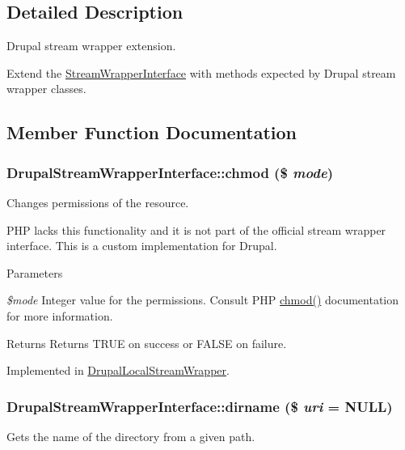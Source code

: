 \subsection{Detailed Description}
Drupal stream wrapper extension.

Extend the \hyperlink{interfaceStreamWrapperInterface}{StreamWrapperInterface} with methods expected by Drupal stream wrapper classes. 

\subsection{Member Function Documentation}
\hypertarget{interfaceDrupalStreamWrapperInterface_a1b1e5436bc2d310b1d340f389f7484b3}{
\subsubsection[{chmod}]{\setlength{\rightskip}{0pt plus 5cm}DrupalStreamWrapperInterface::chmod (\$ {\em mode})}}
\label{interfaceDrupalStreamWrapperInterface_a1b1e5436bc2d310b1d340f389f7484b3}
Changes permissions of the resource.

PHP lacks this functionality and it is not part of the official stream wrapper interface. This is a custom implementation for Drupal.


\begin{DoxyParams}{Parameters}
\item[{\em \$mode}]Integer value for the permissions. Consult PHP \hyperlink{interfaceDrupalStreamWrapperInterface_a1b1e5436bc2d310b1d340f389f7484b3}{chmod()} documentation for more information.\end{DoxyParams}
\begin{DoxyReturn}{Returns}
Returns TRUE on success or FALSE on failure. 
\end{DoxyReturn}


Implemented in \hyperlink{classDrupalLocalStreamWrapper_a7ea693783119ad777d54d447bddcee8f}{DrupalLocalStreamWrapper}.\hypertarget{interfaceDrupalStreamWrapperInterface_a4d189eb40075b3873752c7706e41aac6}{
\subsubsection[{dirname}]{\setlength{\rightskip}{0pt plus 5cm}DrupalStreamWrapperInterface::dirname (\$ {\em uri} = {\ttfamily NULL})}}
\label{interfaceDrupalStreamWrapperInterface_a4d189eb40075b3873752c7706e41aac6}
Gets the name of the directory from a given path.

